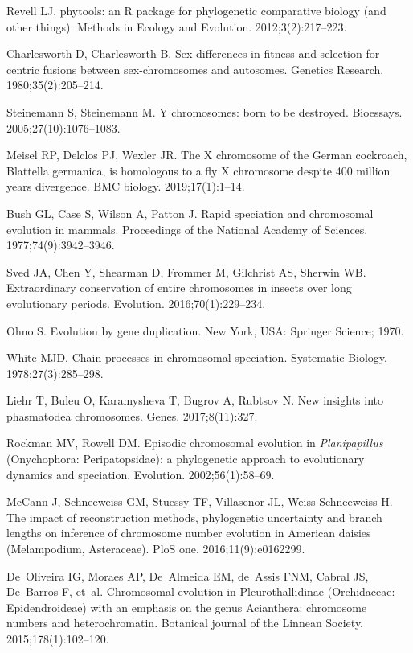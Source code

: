 \documentclass[]{rsos}%
\begin{document}
\begin{thebibliography}{9}
Revell LJ.
 phytools: an R package for phylogenetic comparative biology (and
  other things).
 Methods in Ecology and Evolution. 2012;3(2):217--223.

Charlesworth D, Charlesworth B.
 Sex differences in fitness and selection for centric fusions between
  sex-chromosomes and autosomes.
 Genetics Research. 1980;35(2):205--214.

Steinemann S, Steinemann M.
 Y chromosomes: born to be destroyed.
 Bioessays. 2005;27(10):1076--1083.

Meisel RP, Delclos PJ, Wexler JR.
 The X chromosome of the German cockroach, Blattella germanica, is
  homologous to a fly X chromosome despite 400 million years divergence.
 BMC biology. 2019;17(1):1--14.

Bush GL, Case S, Wilson A, Patton J.
 Rapid speciation and chromosomal evolution in mammals.
 Proceedings of the National Academy of Sciences.
  1977;74(9):3942--3946.

Sved JA, Chen Y, Shearman D, Frommer M, Gilchrist AS, Sherwin WB.
 Extraordinary conservation of entire chromosomes in insects over long
  evolutionary periods.
 Evolution. 2016;70(1):229--234.

Ohno S.
 Evolution by gene duplication.
 New York, USA: Springer Science; 1970.

White MJD.
 Chain processes in chromosomal speciation.
 Systematic Biology. 1978;27(3):285--298.
 
Liehr T, Buleu O, Karamysheva T, Bugrov A, Rubtsov N.
 New insights into phasmatodea chromosomes.
Genes. 2017;8(11):327.

Rockman MV, Rowell DM.
 Episodic chromosomal evolution in \emph{{P}lanipapillus}
  ({O}nychophora: {P}eripatopsidae): a phylogenetic approach to evolutionary
  dynamics and speciation.
 Evolution. 2002;56(1):58--69.

McCann J, Schneeweiss GM, Stuessy TF, Villasenor JL, Weiss-Schneeweiss H.
 The impact of reconstruction methods, phylogenetic uncertainty and
  branch lengths on inference of chromosome number evolution in American
  daisies (Melampodium, Asteraceae).
 PloS one. 2016;11(9):e0162299.

De~Oliveira IG, Moraes AP, De~Almeida EM, de~Assis FNM, Cabral JS, De~Barros F,
  et~al.
 Chromosomal evolution in Pleurothallidinae (Orchidaceae:
  Epidendroideae) with an emphasis on the genus Acianthera: chromosome numbers
  and heterochromatin.
 Botanical journal of the Linnean Society. 2015;178(1):102--120.


\end{thebibliography}
\end{document}
